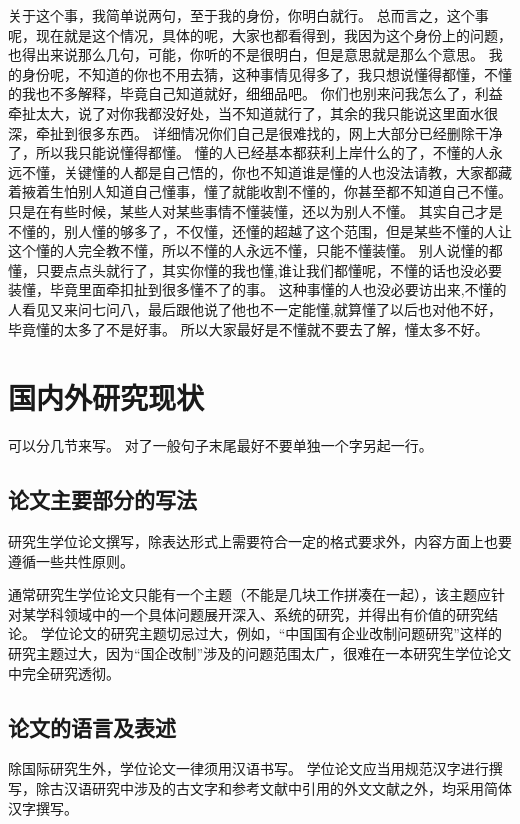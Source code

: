 关于这个事，我简单说两句，至于我的身份，你明白就行。
总而言之，这个事呢，现在就是这个情况，具体的呢，大家也都看得到，我因为这个身份上的问题，也得出来说那么几句，可能，你听的不是很明白，但是意思就是那么个意思。
我的身份呢，不知道的你也不用去猜，这种事情见得多了，我只想说懂得都懂，不懂的我也不多解释，毕竟自己知道就好，细细品吧。
你们也别来问我怎么了，利益牵扯太大，说了对你我都没好处，当不知道就行了，其余的我只能说这里面水很深，牵扯到很多东西。
详细情况你们自己是很难找的，网上大部分已经删除干净了，所以我只能说懂得都懂。
懂的人已经基本都获利上岸什么的了，不懂的人永远不懂，关键懂的人都是自己悟的，你也不知道谁是懂的人也没法请教，大家都藏着掖着生怕别人知道自己懂事，懂了就能收割不懂的，你甚至都不知道自己不懂。
只是在有些时候，某些人对某些事情不懂装懂，还以为别人不懂。
其实自己才是不懂的，别人懂的够多了，不仅懂，还懂的超越了这个范围，但是某些不懂的人让这个懂的人完全教不懂，所以不懂的人永远不懂，只能不懂装懂。
别人说懂的都懂，只要点点头就行了，其实你懂的我也懂,谁让我们都懂呢，不懂的话也没必要装懂，毕竟里面牵扣扯到很多懂不了的事。
这种事懂的人也没必要访出来,不懂的人看见又来问七问八，最后跟他说了他也不一定能懂,就算懂了以后也对他不好，毕竟懂的太多了不是好事。
所以大家最好是不懂就不要去了解，懂太多不好。

\section{国内外研究现状}

可以分几节来写。
对了一般句子末尾最好不要单独一个字另起一行。

\subsection{论文主要部分的写法}

研究生学位论文撰写，除表达形式上需要符合一定的格式要求外，内容方面上也要遵循一些共性原则。

通常研究生学位论文只能有一个主题（不能是几块工作拼凑在一起），该主题应针对某学科领域中的一个具体问题展开深入、系统的研究，并得出有价值的研究结论。
学位论文的研究主题切忌过大，例如，“中国国有企业改制问题研究”这样的研究主题过大，因为“国企改制”涉及的问题范围太广，很难在一本研究生学位论文中完全研究透彻。

\subsection{论文的语言及表述}

除国际研究生外，学位论文一律须用汉语书写。
学位论文应当用规范汉字进行撰写，除古汉语研究中涉及的古文字和参考文献中引用的外文文献之外，均采用简体汉字撰写。

